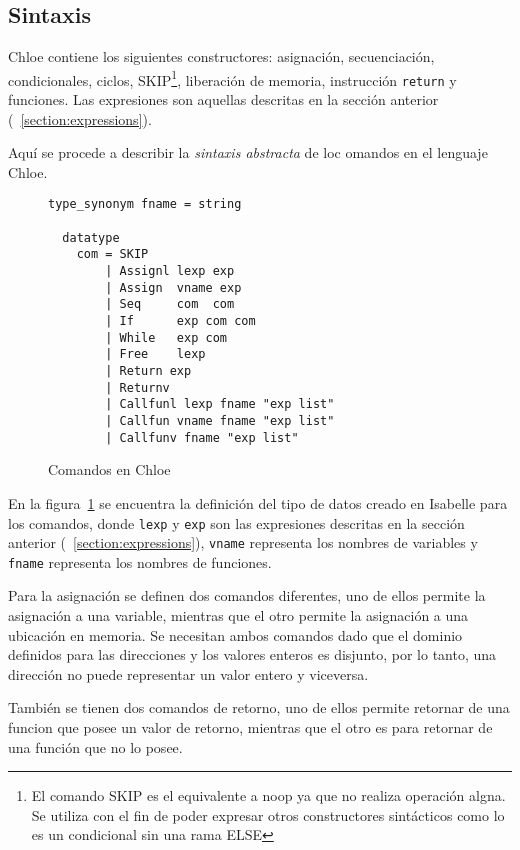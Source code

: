 \subsection{Sintaxis}\label{subsection:syntax_commands}

Chloe contiene los siguientes constructores: asignación, secuenciación, condicionales, ciclos, SKIP\footnote{El comando SKIP es el equivalente a noop ya que no realiza operación algna. Se utiliza con el fin de poder expresar otros constructores sintácticos como lo es un condicional sin una rama ELSE}, liberación de memoria, instrucción \verb|return| y funciones.
Las expresiones son aquellas descritas en la sección anterior (~\ref{section:expressions}).

Aquí se procede a describir la \textit{sintaxis abstracta} de loc omandos en el lenguaje Chloe.

\begin{figure}
  \begin{lstlisting}[frame=single, mathescape=true]
  type_synonym fname = string

  datatype
    com = SKIP
        | Assignl lexp exp
        | Assign  vname exp
        | Seq     com  com
        | If      exp com com
        | While   exp com
        | Free    lexp
        | Return exp
        | Returnv
        | Callfunl lexp fname "exp list"
        | Callfun vname fname "exp list"
        | Callfunv fname "exp list"
  \end{lstlisting}

  \caption{Comandos en Chloe}
  \label{fig:chloe_commands}
\end{figure}

En la figura~\ref{fig:chloe_commands} se encuentra la definición del tipo de datos creado en Isabelle para los comandos, donde \verb|lexp| y \verb|exp| son las expresiones descritas en la sección anterior (~\ref{section:expressions}), \verb|vname| representa los nombres de variables y \verb|fname| representa los nombres de funciones.

Para la asignación se definen dos comandos diferentes, uno de ellos permite la asignación a una variable, mientras que el otro permite la asignación a una ubicación en memoria.
Se necesitan ambos comandos dado que el dominio definidos para las direcciones y los valores enteros es disjunto, por lo tanto, una dirección no puede representar un valor entero y viceversa.

También se tienen dos comandos de retorno, uno de ellos permite retornar de una funcion que posee un valor de retorno, mientras que el otro es para retornar de una función que no lo posee.

